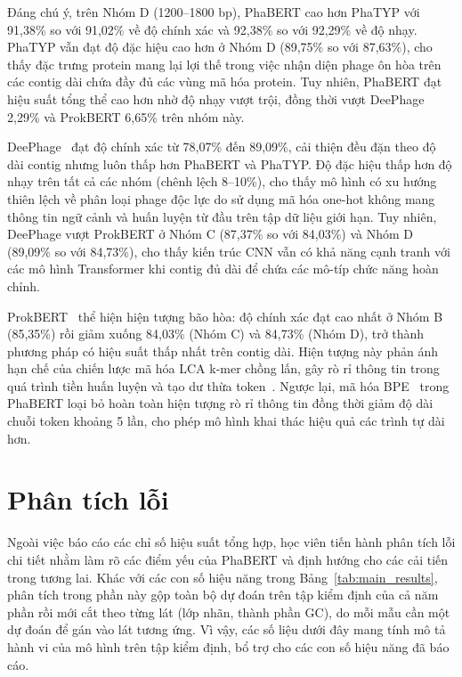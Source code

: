 Đáng chú ý, trên Nhóm D (1200--1800 bp), PhaBERT cao hơn PhaTYP với 91,38\% so với 91,02\% về độ chính xác và 92,38\% so với 92,29\% về độ nhạy. PhaTYP vẫn đạt độ đặc hiệu cao hơn ở Nhóm D (89,75\% so với 87,63\%), cho thấy đặc trưng protein mang lại lợi thế trong việc nhận diện phage ôn hòa trên các contig dài chứa đầy đủ các vùng mã hóa protein. Tuy nhiên, PhaBERT đạt hiệu suất tổng thể cao hơn nhờ độ nhạy vượt trội, đồng thời vượt DeePhage 2,29\% và ProkBERT 6,65\% trên nhóm này.

DeePhage~\cite{wu2021deephage} đạt độ chính xác từ 78,07\% đến 89,09\%, cải thiện đều đặn theo độ dài contig nhưng luôn thấp hơn PhaBERT và PhaTYP. Độ đặc hiệu thấp hơn độ nhạy trên tất cả các nhóm (chênh lệch 8--10\%), cho thấy mô hình có xu hướng thiên lệch về phân loại phage độc lực do sử dụng mã hóa one-hot không mang thông tin ngữ cảnh và huấn luyện từ đầu trên tập dữ liệu giới hạn. Tuy nhiên, DeePhage vượt ProkBERT ở Nhóm C (87,37\% so với 84,03\%) và Nhóm D (89,09\% so với 84,73\%), cho thấy kiến trúc CNN vẫn có khả năng cạnh tranh với các mô hình Transformer khi contig đủ dài để chứa các mô-típ chức năng hoàn chỉnh.

ProkBERT~\cite{ligeti2024prokbert} thể hiện hiện tượng bão hòa: độ chính xác đạt cao nhất ở Nhóm B (85,35\%) rồi giảm xuống 84,03\% (Nhóm C) và 84,73\% (Nhóm D), trở thành phương pháp có hiệu suất thấp nhất trên contig dài. Hiện tượng này phản ánh hạn chế của chiến lược mã hóa LCA k-mer chồng lấn, gây rò rỉ thông tin trong quá trình tiền huấn luyện và tạo dư thừa token~\cite{zhou2023dnabert}. Ngược lại, mã hóa BPE~\cite{sennrich2015neural} trong PhaBERT loại bỏ hoàn toàn hiện tượng rò rỉ thông tin đồng thời giảm độ dài chuỗi token khoảng 5 lần, cho phép mô hình khai thác hiệu quả các trình tự dài hơn.

\section{Phân tích lỗi}
\label{sec:phan_tich_loi}

Ngoài việc báo cáo các chỉ số hiệu suất tổng hợp, học viên tiến hành phân tích lỗi chi tiết nhằm làm rõ các điểm yếu của PhaBERT và định hướng cho các cải tiến trong tương lai. Khác với các con số hiệu năng trong Bảng~\ref{tab:main_results}, phân tích trong phần này gộp toàn bộ dự đoán trên tập kiểm định của cả năm phần rồi mới cắt theo từng lát (lớp nhãn, thành phần GC), do mỗi mẫu cần một dự đoán để gán vào lát tương ứng. Vì vậy, các số liệu dưới đây mang tính mô tả hành vi của mô hình trên tập kiểm định, bổ trợ cho các con số hiệu năng đã báo cáo.


